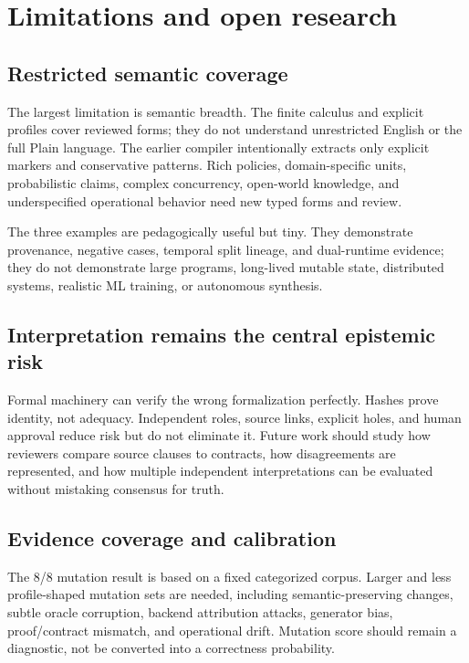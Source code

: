 \documentclass[11pt]{article}
\begin{document}
\section{Limitations and open research}

\subsection{Restricted semantic coverage}

The largest limitation is semantic breadth.  The finite calculus and explicit
profiles cover reviewed forms; they do not understand unrestricted English or
the full Plain language.  The earlier compiler intentionally extracts only
explicit markers and conservative patterns.  Rich policies, domain-specific
units, probabilistic claims, complex concurrency, open-world knowledge, and
underspecified operational behavior need new typed forms and review.

The three examples are pedagogically useful but tiny.  They demonstrate
provenance, negative cases, temporal split lineage, and dual-runtime evidence;
they do not demonstrate large programs, long-lived mutable state, distributed
systems, realistic ML training, or autonomous synthesis.

\subsection{Interpretation remains the central epistemic risk}

Formal machinery can verify the wrong formalization perfectly.  Hashes prove
identity, not adequacy.  Independent roles, source links, explicit holes, and
human approval reduce risk but do not eliminate it.  Future work should study
how reviewers compare source clauses to contracts, how disagreements are
represented, and how multiple independent interpretations can be evaluated
without mistaking consensus for truth.

\subsection{Evidence coverage and calibration}

The 8/8 mutation result is based on a fixed categorized corpus.  Larger and
less profile-shaped mutation sets are needed, including semantic-preserving
changes, subtle oracle corruption, backend attribution attacks, generator
bias, proof/contract mismatch, and operational drift.  Mutation score should
remain a diagnostic, not be converted into a correctness probability.
\end{document}

